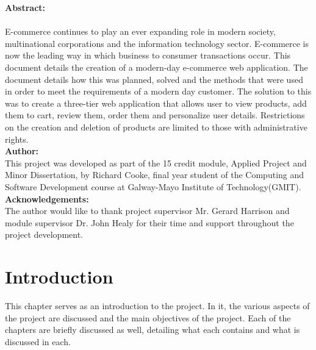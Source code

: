 
{\noindent\Large\textbf {Abstract:}} \\  \\ E-commerce continues to play an ever expanding role in modern society, multinational corporations and the information technology sector. E-commerce is now the leading way in which business to consumer transactions occur. This document details the creation of a modern-day e-commerce web application. The document details how this was planned, solved and the methods that were used in order to meet the requirements of a modern day customer. The solution to this was to create a three-tier web application that allows user to view products, add them to cart, review them, order them and personalize user details. Restrictions on the creation and deletion of products are limited to those with administrative rights. \\ 

{\noindent\Large\textbf {Author:}} \\  This project was developed as part of the 15 credit module, Applied Project and Minor Dissertation, by Richard Cooke, final year student of the Computing and Software Development course at Galway-Mayo Institute of Technology(GMIT).\\

{\noindent\Large\textbf {Acknowledgements:}} \\ The author would like to thank project supervisor Mr. Gerard Harrison and module supervisor Dr. John Healy for their time and support throughout the project development. 


\chapter{Introduction}
This chapter serves as an introduction to the project. In it, the various aspects
of the project are discussed and the main objectives of the project. Each of the 
chapters are briefly discussed as well, detailing what each contains and what is
discussed in each. \\ \\

